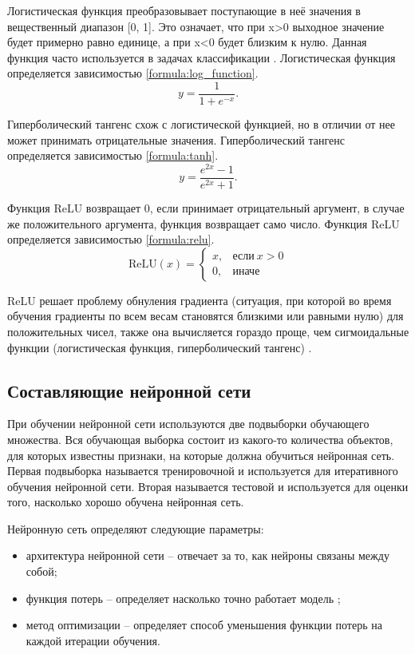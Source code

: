 Логистическая функция преобразовывает поступающие в неё значения в
вещественный диапазон [0, 1]. Это означает, что при x>0 выходное значение будет примерно равно единице, а при x<0 будет близким к нулю. Данная функция часто используется в задачах классификации \cite{activation_function}. Логистическая функция определяется зависимостью \ref{formula:log_function}.
\begin{equation}\label{formula:log_function}
y = \frac{1}{1 + e^{-x}}.
\end{equation}

Гиперболический тангенс схож с логистической функцией, но в отличии от нее может принимать отрицательные значения. Гиперболический тангенс определяется зависимостью \ref{formula:tanh}.
\begin{equation}\label{formula:tanh}
y = \frac{e^{2x} - 1}{e^{2x} + 1}.
\end{equation}

Функция ReLU возвращает 0, если принимает отрицательный аргумент, в случае же положительного аргумента, функция возвращает само число. Функция ReLU определяется зависимостью \ref{formula:relu}.
\begin{equation}\label{formula:relu}
\mathrm{ReLU}(x)=\begin{cases}
x, & \text{если}\ x>0 \\
0, & \text{иначе}
\end{cases}
\end{equation} 

ReLU решает проблему обнуления градиента (ситуация, при которой во время обучения градиенты по всем весам становятся близкими или равными нулю) для положительных чисел, также она вычисляется гораздо проще, чем сигмоидальные функции (логистическая функция, гиперболический тангенс) \cite{activation_function}.

\subsection{Составляющие нейронной сети}
При обучении нейронной сети используются две подвыборки обучающего множества. Вся обучающая выборка состоит из какого-то количества объектов, для которых известны признаки, на которые должна обучиться нейронная сеть. Первая подвыборка называется тренировочной и используется для итеративного обучения нейронной сети. Вторая называется тестовой и используется для оценки того, насколько хорошо обучена нейронная сеть.

Нейронную сеть определяют следующие параметры:
\begin{itemize}
	\item архитектура нейронной сети -- отвечает за то, как нейроны связаны между собой;
	\item функция потерь -- определяет насколько точно работает модель \cite{neuro_base};
	\item метод оптимизации -- определяет способ уменьшения функции потерь на каждой итерации обучения.
\end{itemize}

